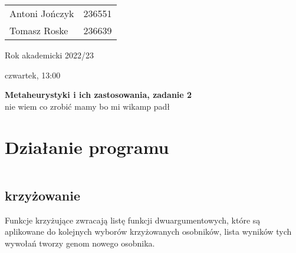 \documentclass{article}
\begin{document}
\begin{minipage}{0.35\linewidth}
	\begin{tabular}{lr}
		Antoni Jończyk & 236551 \\
		Tomasz Roske   & 236639
	\end{tabular} \hfill
\end{minipage}
\hfill
\begin{minipage}{0.35\linewidth}
	\hfill Rok akademicki 2022/23 \par
	\hfill czwartek, 13:00
\end{minipage}
\bigskip \bigskip \bigskip \bigskip \bigskip
\begin{center}
	\textbf{Metaheurystyki i ich zastosowania, zadanie 2}\\
	\bigskip
	\large nie wiem co zrobić mamy bo mi wikamp padł
\end{center}
\bigskip \bigskip
\section{Działanie programu}
\inputminted{clojure}{snippets/alg.clj_advance}
\subsection{krzyżowanie}
Funkcje krzyżujące zwracają listę funkcji dwuargumentowych, które są aplikowane
do kolejnych wyborów krzyżowanych osobników, lista wyników tych wywołań tworzy
genom nowego osobnika.
\end{document}
